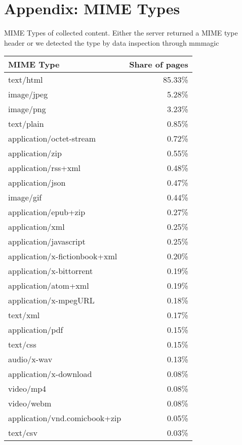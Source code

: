 \newpage
%
%
\section{Appendix: MIME Types}
\label{appendix:A}
MIME Types of collected content. Either the server returned a MIME type header or we detected the type by data inspection through mmmagic\cite{mscdex}
\iflncs
\begin{center}
\label{table:mime types}
\begin{tabular*}{\textwidth}{l@{\extracolsep{\fill}}r}
    \textbf{MIME Type} & \textbf{Share of pages}\\
	\hline
	\hline
	text/html			&	85.33\% \\
	\hline
	image/jpeg			&	5.28\% \\
	\hline
	image/png			&	3.23\% \\
	\hline
	text/plain			&	0.85\% \\
	\hline
	application/octet-stream		&	0.72\% \\
	\hline
	application/zip		&	0.55\% \\
	\hline
	application/rss+xml	&	0.48\% \\
	\hline
	application/json	&	0.47\% \\
	\hline
	image/gif			&	0.44\% \\
	\hline
	application/epub+zip			&	0.27\% \\
	\hline
	application/xml		&	0.25\% \\
	\hline
	application/javascript			&	0.25\% \\
	\hline
	application/x-fictionbook+xml	&	0.20\% \\
	\hline
	application/x-bittorrent		&	0.19\% \\
	\hline
	application/atom+xml			&	0.19\% \\
	\hline
	application/x-mpegURL			&	0.18\% \\
	\hline
	text/xml			&	0.17\% \\
	\hline
	application/pdf		&	0.15\% \\
	\hline
	text/css			&	0.15\% \\
	\hline
	audio/x-wav			&	0.13\% \\
	\hline
	application/x-download			&	0.08\% \\
	\hline
	video/mp4			&	0.08\% \\
	\hline
	video/webm			&	0.08\% \\
	\hline
	application/vnd.comicbook+zip	&	0.05\% \\
	\hline
	text/csv			&	0.03\% \\

\end{tabular*}
\end{center}
